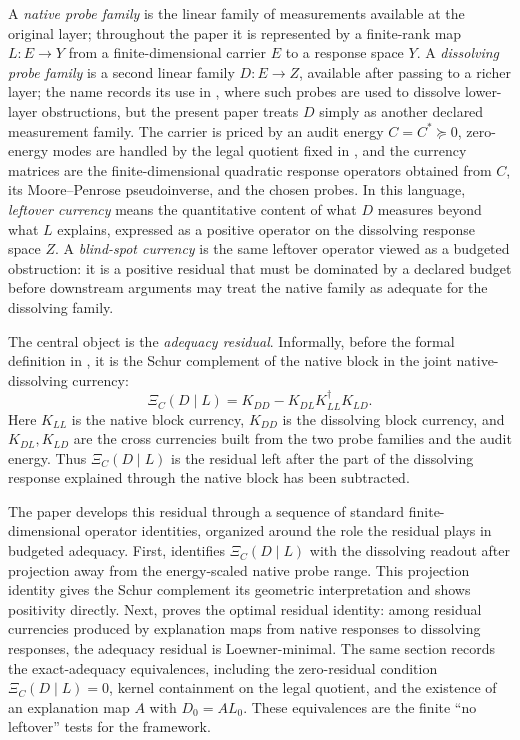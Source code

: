 \documentclass[11pt]{article}
\theoremstyle{definition}
\begin{document}
A \emph{native probe family} is the linear family of measurements available at
the original layer; throughout the paper it is represented by a finite-rank map
\(L\colon E\to Y\) from a finite-dimensional carrier \(E\) to a response space
\(Y\).  A \emph{dissolving probe family} is a second linear family
\(D\colon E\to Z\), available after passing to a richer layer; the name records
its use in \citet{Tsiokos2026NeedleKiller}, where such probes are used to
dissolve lower-layer obstructions, but the present paper treats \(D\) simply as
another declared measurement family.  The carrier is priced by an audit energy
\(C=C^*\succeq 0\), zero-energy modes are handled by the legal quotient fixed in
, and the currency matrices are the finite-dimensional
quadratic response operators obtained from \(C\), its Moore--Penrose
pseudoinverse, and the chosen probes.  In this language, \emph{leftover
currency} means the quantitative content of what \(D\) measures beyond what
\(L\) explains, expressed as a positive operator on the dissolving response
space \(Z\).  A \emph{blind-spot currency} is the same leftover operator viewed
as a budgeted obstruction: it is a positive residual that must be dominated by a
declared budget before downstream arguments may treat the native family as
adequate for the dissolving family.

The central object is the \emph{adequacy residual}.  Informally, before the
formal definition in , it is the Schur complement of
the native block in the joint native-dissolving currency:
\[
  \Xi_C(D\mid L)
  =
  K_{DD}-K_{DL}K_{LL}^{\dagger}K_{LD}.
\]
Here \(K_{LL}\) is the native block currency, \(K_{DD}\) is the dissolving block
currency, and \(K_{DL},K_{LD}\) are the cross currencies built from the two probe
families and the audit energy.  Thus \(\Xi_C(D\mid L)\) is the residual left
after the part of the dissolving response explained through the native block has
been subtracted.

The paper develops this residual through a sequence of standard
finite-dimensional operator identities, organized around the role the residual
plays in budgeted adequacy.  First,  identifies
\(\Xi_C(D\mid L)\) with the dissolving readout after projection away from the
energy-scaled native probe range.  This projection identity gives the Schur
complement its geometric interpretation and shows positivity directly.  Next,
 proves the optimal residual identity: among residual
currencies produced by explanation maps from native responses to dissolving
responses, the adequacy residual is Loewner-minimal.  The same section records
the exact-adequacy equivalences, including the zero-residual condition
\(\Xi_C(D\mid L)=0\), kernel containment on the legal quotient, and the
existence of an explanation map \(A\) with \(D_0=AL_0\).  These equivalences are
the finite ``no leftover'' tests for the framework.
\end{document}
